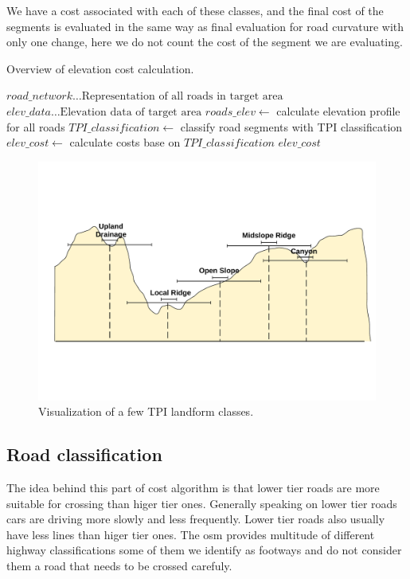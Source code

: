 \documentclass[oneside]{article}
\begin{document}
        We have a cost associated with each of these classes, and the final cost of the segments is evaluated in the same way as final evaluation for road curvature with only one change, here we do not count the cost of the segment we are evaluating.
        \begin{algorithm}
        \caption{Overview of elevation cost calculation.}
        \begin{algorithmic}
        \Require $road\_network \ldots \textrm{Representation of all roads in target area}$
        \Require $elev\_data \ldots \textrm{Elevation data of target area}$
        \State $roads\_elev \gets$ calculate elevation profile for all roads
        \State $TPI\_classification \gets$ classify road segments with TPI classification
        \State $elev\_cost \gets$ calculate costs base on $TPI\_classification$
        \Ensure $elev\_cost$
        \end{algorithmic}
        \end{algorithm}
        

        \begin{figure}[H]
            \centering
            \includegraphics[trim={1.5cm 5.2cm 1.2cm 5.4cm}, clip, width=\linewidth]{TPI_classification.pdf}
            \caption{Visualization of a few TPI landform classes.}
            \label{fig:TPI}
        \end{figure}

        \subsection{Road classification}
        The idea behind this part of cost algorithm is that lower tier roads are more suitable for crossing than higer tier ones. Generally speaking on lower tier roads cars are driving more slowly and less frequently. Lower tier roads also usually have less lines than higer tier ones. The osm provides multitude of different highway classifications some of them we identify as footways and do not consider them a road that needs to be crossed carefuly.
\end{document}
